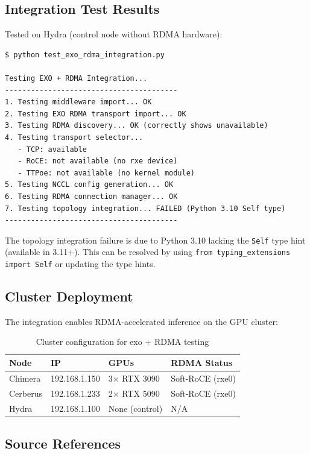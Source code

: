 \documentclass[10pt,letterpaper]{article}
\begin{document}
\subsection{Integration Test Results}

Tested on Hydra (control node without RDMA hardware):

\begin{lstlisting}
$ python test_exo_rdma_integration.py

Testing EXO + RDMA Integration...
----------------------------------------
1. Testing middleware import... OK
2. Testing EXO RDMA transport import... OK
3. Testing RDMA discovery... OK (correctly shows unavailable)
4. Testing transport selector...
   - TCP: available
   - RoCE: not available (no rxe device)
   - TTPoe: not available (no kernel module)
5. Testing NCCL config generation... OK
6. Testing RDMA connection manager... OK
7. Testing topology integration... FAILED (Python 3.10 Self type)
----------------------------------------
\end{lstlisting}

The topology integration failure is due to Python 3.10 lacking the \texttt{Self} type hint (available in 3.11+). This can be resolved by using \texttt{from typing\_extensions import Self} or updating the type hints.

\subsection{Cluster Deployment}

The integration enables RDMA-accelerated inference on the GPU cluster:

\begin{table}[H]
\centering
\small
\begin{tabular}{@{}llll@{}}
\toprule
\textbf{Node} & \textbf{IP} & \textbf{GPUs} & \textbf{RDMA Status} \\
\midrule
Chimera & 192.168.1.150 & 3$\times$ RTX 3090 & Soft-RoCE (rxe0) \\
Cerberus & 192.168.1.233 & 2$\times$ RTX 5090 & Soft-RoCE (rxe0) \\
Hydra & 192.168.1.100 & None (control) & N/A \\
\bottomrule
\end{tabular}
\caption{Cluster configuration for exo + RDMA testing}
\end{table}

\subsection{Source References}
\end{document}
